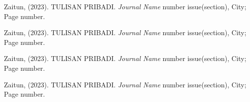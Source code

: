 \begin{thebibliography}{2}
    Zaitun,				                   %
        \newblock  (2023).					       %
        \newblock TULISAN PRIBADI.			       %
        \newblock \emph{Journal Name} number issue(section),  %
        \newblock City;										  %
        \newblock Page number.

    Zaitun,				                   %
        \newblock  (2023).					       %
        \newblock TULISAN PRIBADI.			       %
        \newblock \emph{Journal Name} number issue(section),  %
        \newblock City;										  %
        \newblock Page number.

    Zaitun,				                   %
        \newblock  (2023).					       %
        \newblock TULISAN PRIBADI.			       %
        \newblock \emph{Journal Name} number issue(section),  %
        \newblock City;										  %
        \newblock Page number.	

    Zaitun,				                   %
        \newblock  (2023).					       %
        \newblock TULISAN PRIBADI.			       %
        \newblock \emph{Journal Name} number issue(section),  %
        \newblock City;										  %
        \newblock Page number.									  %
\end{thebibliography}